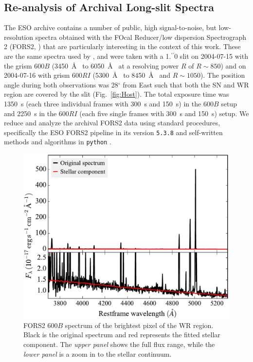 \documentclass[traditabstract, referee]{aa}
\newcommand{\farc}{\hbox{$.\!\!^{\prime\prime}$}}
\begin{document}
\begin{appendix}

\section{Re-analysis of Archival Long-slit Spectra}
\label{app:fors}

The ESO archive contains a number of public, high signal-to-noise, but low-resolution spectra obtained with the FOcal Reducer/low dispersion Spectrograph 2 (FORS2, \citealt{1998Msngr..94....1A}) that are particularly interesting in the context of this work. These are the same spectra used by \citet{2006A&A...454..103H}, and were taken with a 1\farc{0} slit on 2004-07-15 with the grism 600$B$ (3450~\AA~ to 6050~\AA~ at a resolving power $R$ of $R\sim850$) and on 2004-07-16 with grism 600$RI$ (5300~\AA~ to 8450~\AA~ and $R\sim1050$). The position angle during both observations was 28$^\circ$ from East such that both the SN and WR region are covered by the slit (Fig.~\ref{fig:Host}). The total exposure time was 1350~s (each three individual frames with 300~s and 150~s) in the 600$B$ setup and 2250~s in the 600$RI$ (each five single frames with 300~s and 150~s) setup. We reduce and analyze the archival FORS2 data using standard procedures, specifically the ESO FORS2 pipeline in its version \texttt{5.3.8} and self-written methods and algorithms in \texttt{python} \citep{2015A&A...581A.125K}.

\begin{figure}
\includegraphics[angle=0, width=0.93\columnwidth]{Figs/FORS2_3700_5300_starlight.pdf}
\caption{FORS2 600$B$ spectrum of the brightest pixel of the WR region. {Black is the original spectrum and red represents the fitted stellar component. The \textit{upper panel} shows the full flux range, while the \textit{lower panel} is a zoom in to the stellar continuum.}}
\label{fig:FORSWR}
\end{figure}


\end{appendix}
\end{document}
